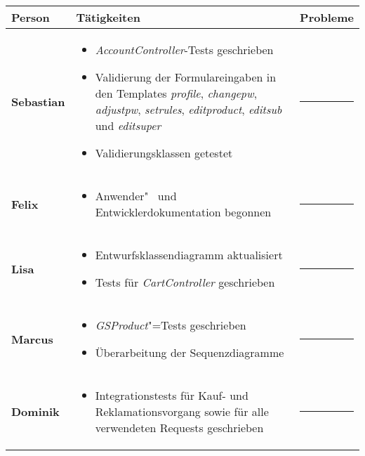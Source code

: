 \documentclass{scrartcl}
\begin{document}
\begin{tabularx}{\textwidth}{p{}p{}X}
\hline
\textsf{\textbf{\large Person}} & \textsf{\textbf{\large Tätigkeiten}} & \textsf{\textbf{\large Probleme}} \\
\hline\hline
\textbf{Sebastian} & 
 \begin{itemize}
 \item \textit{AccountController}-Tests geschrieben
 \item Validierung der Formulareingaben in den Templates \textit{profile}, \textit{changepw}, \textit{adjustpw}, \textit{setrules}, \textit{editproduct}, \textit{editsub} und \textit{editsuper}
 \item Validierungsklassen getestet
 \end{itemize}
 & \rule[1ex]{.7cm}{1pt} \\ \hline
\textbf{Felix} & 
 \begin{itemize}
 \item Anwender"~ und Entwicklerdokumentation begonnen
 \end{itemize}
 & \rule[1ex]{.7cm}{1pt} \\ \hline
\textbf{Lisa} & 
 \begin{itemize}
 \item Entwurfsklassendiagramm aktualisiert
 \item Tests für \textit{CartController} geschrieben
 \end{itemize}
& \rule[1ex]{.7cm}{1pt} \\ \hline
\textbf{Marcus} & 
 \begin{itemize}
 \item \textit{GSProduct}"=Tests geschrieben
 \item Überarbeitung der Sequenzdiagramme
 \end{itemize}
& \rule[1ex]{.7cm}{1pt} \\ \hline
\textbf{Dominik} &
 \begin{itemize}
 \item Integrationstests für Kauf- und Reklamationsvorgang sowie für alle verwendeten Requests geschrieben
 \end{itemize}
& \rule[1ex]{.7cm}{1pt} \\ \hline
\end{tabularx}\\

\vspace{1em}
\end{document}
